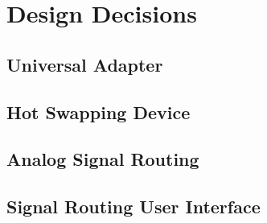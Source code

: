 \section{Design Decisions}
	\subsection{Universal Adapter}
	

	\subsection{Hot Swapping Device}
	

	\subsection{Analog Signal Routing}
	

	\subsection{Signal Routing User Interface}
	


